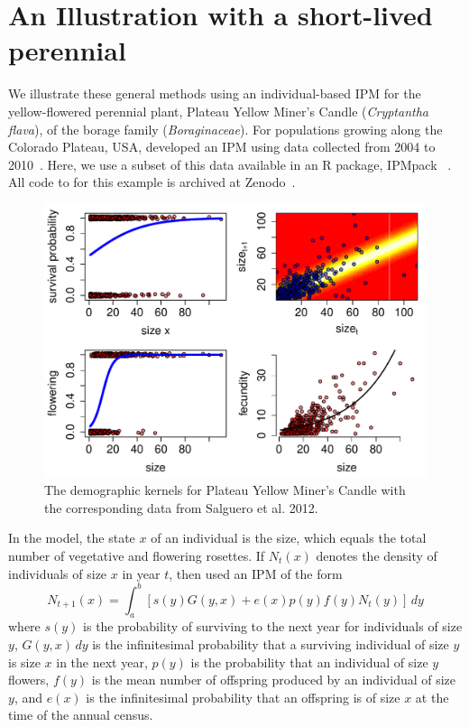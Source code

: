 \documentclass[12pt]{amsart}\usepackage[]{graphicx}\usepackage[]{color}
\makeatletter
\def\maxwidth{ %
  \ifdim\Gin@nat@width>\linewidth
    \linewidth
  \else
    \Gin@nat@width
  \fi
}
\newenvironment{knitrout}{}{} %
\makeatother
\begin{document}
\section*{An Illustration with a short-lived perennial}

We illustrate these general methods using an individual-based IPM for the yellow-flowered perennial plant, Plateau Yellow Miner's Candle (\emph{Cryptantha flava}), of the borage family (\emph{Boraginaceae}). For populations growing along the Colorado Plateau, USA, \citet{salguero-etal-12} developed an IPM using data collected from 2004 to 2010~\citep{salguero-gomez-etal-14}. Here, we use a subset of this data available in an R package, IPMpack ~\citep{IPMpack}.  All code to for this example is archived at Zenodo~\citep{schreiber-ross-ibipm-code-2015}.

\begin{knitrout}
\color{fgcolor}\begin{figure}
\includegraphics[width=\maxwidth]{figure/components-1} \caption[The demographic kernels for Plateau Yellow Miner's Candle with the corresponding data from Salguero et al]{The demographic kernels for Plateau Yellow Miner's Candle with the corresponding data from Salguero et al. 2012.}\label{fig:components}
\end{figure}


\end{knitrout}

In the model, the state $x$ of an individual is the size, which equals the total number of vegetative and flowering rosettes. If $N_t(x)$ denotes the density of individuals of size $x$ in year $t$, then \citet{salguero-etal-12} used an IPM of the form
\[
N_{t+1}(x)=\int_a^b \left[ s(y)G(y, x)+e(x)p(y)f(y)N_t(y)\right]\, dy
\]
where $s(y)$ is the probability of surviving to the next year for individuals of size $y$, $G(y, x) \, dy$ is the infinitesimal probability that a surviving individual of size $y$ is size $x$ in the next year, $p(y)$ is the probability that an individual of size $y$ flowers, $f(y)$ is the mean number of offspring produced by an individual of size $y$, and $e(x)$ is the infinitesimal probability that an offspring is of size $x$ at the time of the annual census.
\end{document}
